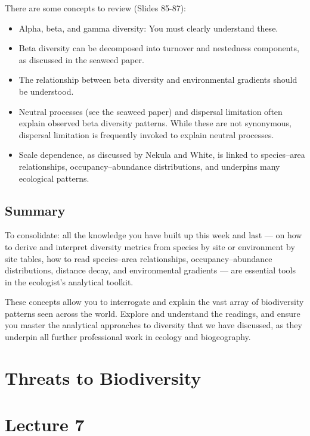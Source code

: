\documentclass[
  10pt,
]{book}
\providecommand{\tightlist}{%
  \setlength{\itemsep}{0pt}\setlength{\parskip}{0pt}}
\begin{document}
There are some concepts to review (Slides 85-87):

\begin{itemize}
\tightlist
\item
  Alpha, beta, and gamma diversity: You must clearly understand these.
\item
  Beta diversity can be decomposed into turnover and nestedness
  components, as discussed in the seaweed paper.
\item
  The relationship between beta diversity and environmental gradients
  should be understood.
\item
  Neutral processes (see the seaweed paper) and dispersal limitation
  often explain observed beta diversity patterns. While these are not
  synonymous, dispersal limitation is frequently invoked to explain
  neutral processes.
\item
  Scale dependence, as discussed by Nekula and White, is linked to
  species--area relationships, occupancy--abundance distributions, and
  underpins many ecological patterns.
\end{itemize}

\section{Summary}\label{summary}

To consolidate: all the knowledge you have built up this week and last
--- on how to derive and interpret diversity metrics from species by
site or environment by site tables, how to read species--area
relationships, occupancy--abundance distributions, distance decay, and
environmental gradients --- are essential tools in the ecologist's
analytical toolkit.

These concepts allow you to interrogate and explain the vast array of
biodiversity patterns seen across the world. Explore and understand the
readings, and ensure you master the analytical approaches to diversity
that we have discussed, as they underpin all further professional work
in ecology and biogeography.

\chapter{Threats to Biodiversity}\label{threats-to-biodiversity}

\chapter*{Lecture 7}\label{lecture-7}
\end{document}
